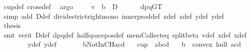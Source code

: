 \begin{isabellebody}
\ cup{}{\isacharunderscore}{\kern0pt}def\ cross{}{\isacharunderscore}{\kern0pt}def\ \isamarkupfalse%
\ argo\isanewline
\ \ \isamarkupfalse%
\ {}{\isacharcolon}{\kern0pt}\ {\isachardoublequoteopen}v\ {\isasymbullet}\ b\ {\isacharless}{\kern0pt}\ D{\isachardoublequoteclose}\ \isamarkupfalse%
\ {}\ {}\ {}\ {}\ dpqGT{}\ \isanewline
\ \ \ \ \isamarkupfalse%
\ {\isacharparenleft}{\kern0pt}simp\ add{\isacharcolon}{\kern0pt}\ D{\isacharunderscore}{\kern0pt}def\ divide{\isacharunderscore}{\kern0pt}strict{\isacharunderscore}{\kern0pt}right{\isacharunderscore}{\kern0pt}mono\ inner{\isacharunderscore}{\kern0pt}prod{\isacharunderscore}{\kern0pt}def\ x{}{\isacharunderscore}{\kern0pt}def\ x{}{\isacharunderscore}{\kern0pt}def\ y{}{\isacharunderscore}{\kern0pt}def\ y{}{\isacharunderscore}{\kern0pt}def{\isacharparenright}{\kern0pt}\isanewline
\ \ \isamarkupfalse%
\ {\isacharquery}{\kern0pt}thesis\ \isamarkupfalse%
\ {}\ \isanewline
\ \ \ \ \isamarkupfalse%
\ {\isacharparenleft}{\kern0pt}smt\ {\isacharparenleft}{\kern0pt}verit{\isacharparenright}{\kern0pt}\ D{\isacharunderscore}{\kern0pt}def\ dpq{\isacharunderscore}{\kern0pt}def\ halfspace{\isacharunderscore}{\kern0pt}pos{\isacharunderscore}{\kern0pt}def\ mem{\isacharunderscore}{\kern0pt}Collect{\isacharunderscore}{\kern0pt}eq\ split{\isacharunderscore}{\kern0pt}beta\ v{\isacharunderscore}{\kern0pt}def\ x{}{\isacharunderscore}{\kern0pt}def\ x{}{\isacharunderscore}{\kern0pt}def\isanewline
\ \ \ \ \ \ \ \ y{}{\isacharunderscore}{\kern0pt}def\ y{}{\isacharunderscore}{\kern0pt}def{\isacharparenright}{\kern0pt}\ \ \ \ \ \ \isanewline
{}\isamarkupfalse%
%
\endisatagproof
{\isafoldproof}%
%
\isadelimproof
\isanewline
%
\endisadelimproof
\isanewline
{}\isamarkupfalse%
\ bNotInCHacd{\isacharcolon}{\kern0pt}\isanewline
\ \ \ {\isachardoublequoteopen}cup\ {}\ {\isacharbrackleft}{\kern0pt}a{\isacharcomma}{\kern0pt}b{\isacharcomma}{\kern0pt}c{\isacharcomma}{\kern0pt}d{\isacharbrackright}{\kern0pt}{\isachardoublequoteclose}\isanewline
\ \ \ {\isachardoublequoteopen}b\ {\isasymnotin}\ convex\ hull\ {\isacharbraceleft}{\kern0pt}a{\isacharcomma}{\kern0pt}c{\isacharcomma}{\kern0pt}d{\isacharbraceright}{\kern0pt}{\isachardoublequoteclose}\isanewline

\end{isabellebody}
